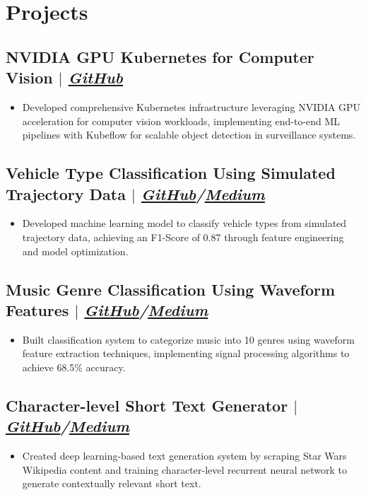 \documentclass[11pt]{article} %
\begin{document}
\section{Projects}
\subsection{NVIDIA GPU Kubernetes for Computer Vision $|$ \normalfont\textit{\href{https://github.com/Pedrohgv/nvidia-gpu-kubernetes}{GitHub}}}
\begin{itemize}
  \item Developed comprehensive Kubernetes infrastructure leveraging NVIDIA GPU acceleration for computer vision workloads, implementing end-to-end ML pipelines with Kubeflow for scalable object detection in surveillance systems.
\end{itemize}

\subsection{Vehicle Type Classification Using Simulated Trajectory Data $|$ \normalfont\textit{\href{https://github.com/Pedrohgv/standard-traffic-data/blob/main/knowledge/Vehicle_Type_Prediction.ipynb}{GitHub}/\href{https://towardsdatascience.com/vehicle-type-prediction-using-simulated-trajectory-data-59a522e30003/}{Medium}}}
\begin{itemize}
  \item Developed machine learning model to classify vehicle types from simulated trajectory data, achieving an F1-Score of 0.87 through feature engineering and model optimization.
\end{itemize}

\subsection{Music Genre Classification Using Waveform Features $|$ \normalfont\textit{\href{https://github.com/Pedrohgv/Music_Genre_Classification/blob/master/notebook.ipynb}{GitHub}/\href{https://towardsdatascience.com/predicting-music-genres-using-waveform-features-5080e788eb64/}{Medium}}}
\begin{itemize}
  \item Built classification system to categorize music into 10 genres using waveform feature extraction techniques, implementing signal processing algorithms to achieve 68.5\% accuracy.
\end{itemize}

\subsection{Character-level Short Text Generator $|$ \normalfont\textit{\href{https://github.com/Pedrohgv/Star-Wars-Text-Generation}{GitHub}/\href{https://towardsdatascience.com/generating-short-star-wars-text-with-lstms-c7dc65e252c4/}{Medium}}}
\begin{itemize}
  \item Created deep learning-based text generation system by scraping Star Wars Wikipedia content and training character-level recurrent neural network to generate contextually relevant short text.
\end{itemize}
\end{document}
